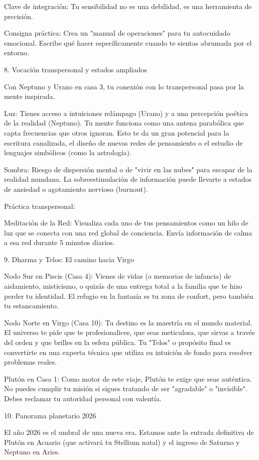 Clave de integración: Tu sensibilidad no es una debilidad, es una herramienta de precisión.

Consigna práctica: Crea un "manual de operaciones" para tu autocuidado emocional. Escribe qué hacer específicamente cuando te sientas abrumada por el entorno.

8. Vocación transpersonal y estados ampliados

Con Neptuno y Urano en casa 3, tu conexión con lo transpersonal pasa por la mente inspirada.

Luz: Tienes acceso a intuiciones relámpago (Urano) y a una percepción poética de la realidad (Neptuno). Tu mente funciona como una antena parabólica que capta frecuencias que otros ignoran. Esto te da un gran potencial para la escritura canalizada, el diseño de nuevas redes de pensamiento o el estudio de lenguajes simbólicos (como la astrología).

Sombra: Riesgo de dispersión mental o de "vivir en las nubes" para escapar de la realidad mundana. La sobreestimulación de información puede llevarte a estados de ansiedad o agotamiento nervioso (burnout).

Práctica transpersonal:

Meditación de la Red: Visualiza cada uno de tus pensamientos como un hilo de luz que se conecta con una red global de conciencia. Envía información de calma a esa red durante 5 minutos diarios.

9. Dharma y Telos: El camino hacia Virgo

Nodo Sur en Piscis (Casa 4): Vienes de vidas (o memorias de infancia) de aislamiento, misticismo, o quizás de una entrega total a la familia que te hizo perder tu identidad. El refugio en la fantasía es tu zona de confort, pero también tu estancamiento.

Nodo Norte en Virgo (Casa 10): Tu destino es la maestría en el mundo material. El universo te pide que te profesionalices, que seas meticulosa, que sirvas a través del orden y que brilles en la esfera pública. Tu "Telos" o propósito final es convertirte en una experta técnica que utiliza su intuición de fondo para resolver problemas reales.

Plutón en Casa 1: Como motor de este viaje, Plutón te exige que seas auténtica. No puedes cumplir tu misión si sigues tratando de ser "agradable" o "invisible". Debes reclamar tu autoridad personal con valentía.

10. Panorama planetario 2026

El año 2026 es el umbral de una nueva era. Estamos ante la entrada definitiva de Plutón en Acuario (que activará tu Stellium natal) y el ingreso de Saturno y Neptuno en Aries.

